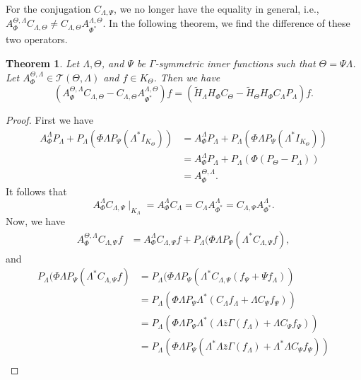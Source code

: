 \documentclass[12pt]{amsart}
\numberwithin{equation}{section}
\newtheorem{theorem}{Theorem}[section]
\theoremstyle{definition}
\numberwithin{equation}{section}
\begin{document}
 For the conjugation $C_{\Lambda,\Psi}$, we no longer have the equality in general, i.e.,  $A_{\Phi}^{\Theta,\Lambda}C_{\Lambda,\Theta}\neq C_{\Lambda, \Theta}A_{\Phi^{*}}^{\Lambda,\Theta}$. In the following theorem, we find the difference of these two operators.
\begin{theorem}
Let $\Lambda, \Theta$, and $\Psi$ be $\Gamma$-symmetric inner functions such that $\Theta=\Psi\Lambda$. Let $A_{\Phi}^{\Theta, \Lambda}\in \mathcal{T}(\Theta,\Lambda)$ and $f\in K_{\Theta}$. Then we have
$$(A_{\Phi}^{\Theta,\Lambda}C_{\Lambda,\Theta}-C_{\Lambda, \Theta}A_{\Phi^{*}}^{\Lambda,\Theta})f=(\widetilde{H}_{\Lambda}H_{\Phi}C_{\Theta}-\widetilde{H}_{\Theta}H_{\Phi}C_{\Lambda}P_{\Lambda})f.$$
\end{theorem}
\begin{proof}
First we have
\begin{align*}
A_{\Phi}^{\Lambda}P_{\Lambda}+P_{\Lambda}(\Phi\Lambda P_{\Psi}(\Lambda^{*} I_{ K_{\Theta}}))
&=A_{\Phi}^{\Lambda}P_{\Lambda}+P_{\Lambda}(\Phi\Lambda P_{\Psi}(\Lambda^{*} I_{ K_{\Theta}}))\\
&=A_{\Phi}^{\Lambda}P_{\Lambda}+P_{\Lambda}(\Phi(P_{\Theta}-P_{\Lambda}))\\
&=A_{\Phi}^{\Theta,\Lambda}.
\end{align*}
It follows that
$$A_{\Phi}^{\Lambda}C_{\Lambda,\Psi}{\mid_{K_{\Lambda}}}=A_{\Phi}^{\Lambda}C_{\Lambda}=C_{\Lambda}A_{\Phi^{*}}^{\Lambda}=C_{\Lambda,\Psi}A_{\Phi^{*}}^{\Lambda}. $$
Now, we have
\begin{align}\label{TOH}
A_{\Phi}^{\Theta,\Lambda}C_{\Lambda,\Psi}f
&=A_{\Phi}^{\Lambda}C_{\Lambda,\Psi}f+P_{\Lambda}(\Phi\Lambda P_{\Psi}(\Lambda^{*} C_{\Lambda,\Psi}f),
\end{align}
and
\begin{align*}
P_{\Lambda}(\Phi\Lambda P_{\Psi}(\Lambda^{*} C_{\Lambda,\Psi}f)
&=P_{\Lambda}(\Phi\Lambda P_{\Psi}(\Lambda^{*} C_{\Lambda,\Psi}(f_{\Psi}+\Psi f_{\Lambda}))\\
&=P_{\Lambda}(\Phi\Lambda P_{\Psi}\Lambda^{*}( C_{\Lambda}f_{\Lambda}+\Lambda C_{\Psi}f_{\Psi}))\\
&=P_{\Lambda}(\Phi\Lambda P_{\Psi}\Lambda^{*}( \Lambda \bar z \Gamma (f_{\Lambda})+\Lambda C_{\Psi}f_{\Psi}))\\
&=P_{\Lambda}(\Phi\Lambda P_{\Psi}( \Lambda^{*}\Lambda \bar z \Gamma (f_{\Lambda})+\Lambda^{*}\Lambda C_{\Psi}f_{\Psi}))\\

\end{align*}
\end{proof}
\end{document}
